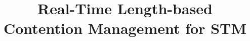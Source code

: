 \documentclass[conference]{IEEEtran}
\begin{document}
\title{Real-Time Length-based Contention Management for STM}



\begin{comment}
\author{\IEEEauthorblockN{Mohammed Elshambakey}
\IEEEauthorblockA{ECE Dept, Virginia Tech\\
Blacksburg, VA 24061, USA\\
Email: shambake@vt.edu}
\and
\IEEEauthorblockN{Binoy Ravindran}
\IEEEauthorblockA{ECE Dept, Virginia Tech\\
Blacksburg, VA 24061, USA\\
Email: binoy@vt.edu}
}
\end{comment}


\maketitle
\end{document}
